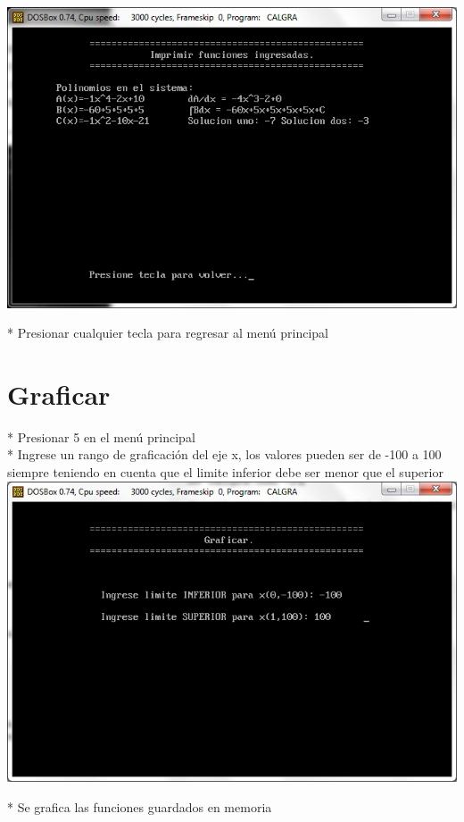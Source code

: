 \documentclass[journal]{../../IEEEtran/IEEEtran}
\begin{document}
\includegraphics[scale=0.42]{img/41.jpg}

* Presionar cualquier tecla para regresar al menú principal\\


\section{Graficar}

* Presionar 5 en el menú principal\\

* Ingrese un rango de graficación del eje x, los valores pueden ser de
-100 a 100 siempre teniendo en cuenta que el limite inferior debe ser
menor que el superior\\

\includegraphics[scale=0.42]{img/51.jpg}

* Se grafica las funciones guardados en memoria\\
\end{document}
